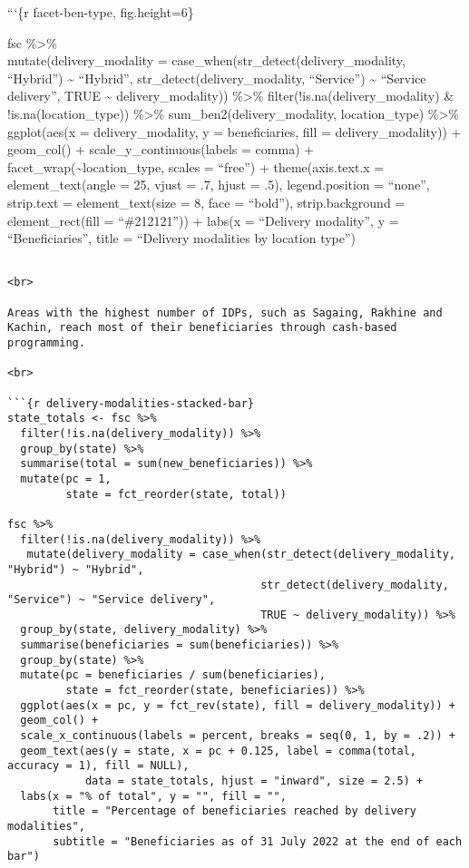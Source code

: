 \documentclass[
]{article}
\begin{document}
```\{r facet-ben-type, fig.height=6\}

fsc \%\textgreater\%\\
mutate(delivery\_modality = case\_when(str\_detect(delivery\_modality,
``Hybrid'') \textasciitilde{} ``Hybrid'',
str\_detect(delivery\_modality, ``Service'') \textasciitilde{} ``Service
delivery'', TRUE \textasciitilde{} delivery\_modality)) \%\textgreater\%
filter(!is.na(delivery\_modality) \& !is.na(location\_type))
\%\textgreater\% sum\_ben2(delivery\_modality, location\_type)
\%\textgreater\% ggplot(aes(x = delivery\_modality, y = beneficiaries,
fill = delivery\_modality)) + geom\_col() + scale\_y\_continuous(labels
= comma) + facet\_wrap(\textasciitilde location\_type, scales =
``free'') + theme(axis.text.x = element\_text(angle = 25, vjust = .7,
hjust = .5), legend.position = ``none'', strip.text = element\_text(size
= 8, face = ``bold''), strip.background = element\_rect(fill =
``\#212121'')) + labs(x = ``Delivery modality'', y = ``Beneficiaries'',
title = ``Delivery modalities by location type'')

\begin{verbatim}

<br>

Areas with the highest number of IDPs, such as Sagaing, Rakhine and Kachin, reach most of their beneficiaries through cash-based programming.

<br>

```{r delivery-modalities-stacked-bar}
state_totals <- fsc %>% 
  filter(!is.na(delivery_modality)) %>% 
  group_by(state) %>% 
  summarise(total = sum(new_beneficiaries)) %>% 
  mutate(pc = 1, 
         state = fct_reorder(state, total))

fsc %>%  
  filter(!is.na(delivery_modality)) %>%  
   mutate(delivery_modality = case_when(str_detect(delivery_modality, "Hybrid") ~ "Hybrid", 
                                       str_detect(delivery_modality, "Service") ~ "Service delivery", 
                                       TRUE ~ delivery_modality)) %>%
  group_by(state, delivery_modality) %>% 
  summarise(beneficiaries = sum(beneficiaries)) %>% 
  group_by(state) %>% 
  mutate(pc = beneficiaries / sum(beneficiaries),
         state = fct_reorder(state, beneficiaries)) %>% 
  ggplot(aes(x = pc, y = fct_rev(state), fill = delivery_modality)) + 
  geom_col() +
  scale_x_continuous(labels = percent, breaks = seq(0, 1, by = .2)) + 
  geom_text(aes(y = state, x = pc + 0.125, label = comma(total, accuracy = 1), fill = NULL), 
            data = state_totals, hjust = "inward", size = 2.5) +
  labs(x = "% of total", y = "", fill = "", 
       title = "Percentage of beneficiaries reached by delivery modalities", 
       subtitle = "Beneficiaries as of 31 July 2022 at the end of each bar")
\end{verbatim}
\end{document}
